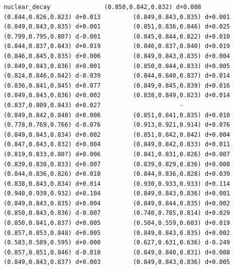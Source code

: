 \documentclass[11pt, letterpaper, openany]{book}
\begin{document}
\begin{empiricalbox}
\begin{lstlisting}[style=terminal]
nuclear_decay               (0.850,0.842,0.832) d+0.008         (0.844,0.826,0.823) d+0.013         (0.849,0.843,0.835) d+0.001         (0.849,0.843,0.835) d+0.001         (0.851,0.836,0.846) d+0.025         (0.799,0.795,0.807) d-0.001         (0.845,0.844,0.822) d+0.010         (0.844,0.837,0.843) d+0.019         (0.846,0.837,0.840) d+0.019         (0.846,0.845,0.835) d+0.006         (0.849,0.843,0.835) d+0.004         (0.849,0.843,0.836) d+0.001         (0.850,0.844,0.833) d+0.005         (0.824,0.846,0.842) d-0.039         (0.844,0.840,0.837) d+0.014         (0.836,0.841,0.845) d+0.077         (0.849,0.845,0.839) d+0.016         (0.849,0.843,0.836) d+0.002         (0.838,0.849,0.823) d+0.014         (0.837,0.809,0.843) d+0.027                      -                      (0.849,0.842,0.840) d+0.006         (0.851,0.841,0.835) d+0.010         (0.778,0.769,0.766) d-0.076         (0.913,0.921,0.914) d+0.076         (0.849,0.843,0.834) d+0.002         (0.851,0.842,0.842) d+0.004         (0.847,0.843,0.832) d+0.004         (0.849,0.842,0.833) d+0.011         (0.819,0.833,0.807) d+0.006         (0.841,0.831,0.826) d+0.007         (0.839,0.830,0.833) d+0.007         (0.839,0.829,0.836) d+0.008         (0.844,0.836,0.826) d+0.010         (0.844,0.836,0.828) d+0.039         (0.838,0.843,0.834) d+0.014         (0.930,0.933,0.933) d+0.114         (0.940,0.939,0.932) d+0.104         (0.849,0.843,0.836) d+0.001         (0.849,0.843,0.835) d+0.004         (0.849,0.844,0.835) d+0.002         (0.850,0.843,0.836) d-0.007         (0.740,0.785,0.814) d+0.029         (0.850,0.841,0.837) d+0.005         (0.504,0.559,0.603) d+0.019         (0.857,0.853,0.848) d+0.005         (0.849,0.843,0.835) d+0.002         (0.583,0.589,0.595) d+0.000         (0.627,0.631,0.636) d-0.249         (0.857,0.851,0.846) d-0.010         (0.849,0.840,0.831) d+0.008         (0.849,0.843,0.837) d+0.003         (0.849,0.843,0.836) d+0.005     

\end{lstlisting}
\end{empiricalbox}
\end{document}
